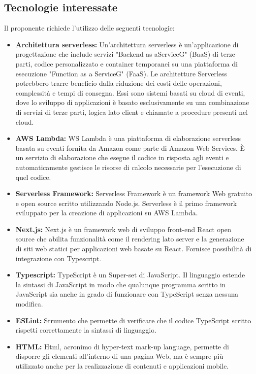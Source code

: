 \subsection{Tecnologie interessate}
Il proponente richiede l’utilizzo delle seguenti tecnologie:
\begin{itemize}
    \item \textbf{Architettura serverless:} Un'architettura serverless è un’applicazione di progettazione che include servizi "Backend as aServiceG" (BaaS) di terze parti, codice personalizzato e container temporanei su una piattaforma di esecuzione "Function as a ServiceG" (FaaS). Le architetture Serverless potrebbero trarre beneficio dalla riduzione dei costi delle operazioni, complessità e tempi di consegna. Essi sono sistemi basati su cloud di eventi, dove lo sviluppo di applicazioni è basato esclusivamente su una combinazione di servizi di terze parti, logica lato client e chiamate a procedure presenti nel cloud.
    \item \textbf{AWS Lambda:} WS Lambda è una piattaforma di elaborazione serverless basata su eventi fornita da Amazon come parte di Amazon Web Services. È un servizio di elaborazione che esegue il codice in risposta agli eventi e automaticamente gestisce le risorse di calcolo necessarie per l'esecuzione di quel codice.
    \item \textbf{Serverless Framework:} Serverless Framework è un framework Web gratuito e open source scritto utilizzando Node.js. Serverless è il primo framework sviluppato per la creazione di applicazioni su AWS Lambda.
    \item \textbf{Next.js:} Next.js è un framework web di sviluppo front-end React open source che abilita funzionalità come il rendering lato server e la generazione di siti web statici per applicazioni web basate su React. Fornisce possibilità di integrazione con Typescript.
    \item \textbf{Typescript:} TypeScript è un Super-set di JavaScript. Il linguaggio estende la sintassi di JavaScript in modo che qualunque programma scritto in JavaScript sia anche in grado di funzionare con TypeScript senza nessuna modifica.
    \item \textbf{ESLint:} Strumento che permette di verificare che il codice TypeScript scritto rispetti correttamente la sintassi di linguaggio.
    \item \textbf{HTML:} Html, acronimo di hyper-text mark-up language, permette di disporre gli elementi all’interno di una pagina Web, ma è sempre più utilizzato anche per la realizzazione di contenuti e applicazioni mobile.

\end{itemize}
